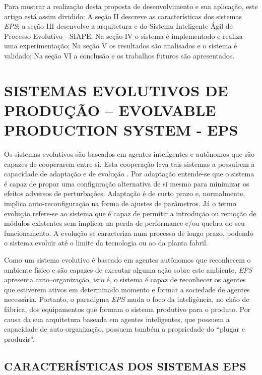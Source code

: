 \documentclass[10pt,letterpaper,twocolumn]{IEEEtran}
\begin{document}
 Para mostrar a realização desta proposta de desenvolvimento e sua aplicação, este artigo está assim dividido: A seção II descreve as características dos sistemas \textit{EPS}; a seção III desenvolve a arquitetura e do Sistema Inteligente Ágil de Processo Evolutivo - SIAPE; Na seção IV o sistema é implementado e realiza uma experimentação; Na seção V os resultados são analisados e o sistema é validado; Na seção VI a conclusão e os trabalhos futuros são apresentados.
 
\section{SISTEMAS EVOLUTIVOS DE PRODUÇÃO -- EVOLVABLE PRODUCTION SYSTEM - EPS}



Os sistemas evolutivos são baseados em agentes inteligentes e autônomos que são capazes de cooperarem entre si. Esta
cooperação leva tais sistemas a possuírem a capacidade de adaptação e de evolução \cite{ROSA2013c}.
Por adaptação entende-se que o sistema é capaz de propor uma configuração alternativa de si mesmo para minimizar os
efeitos adversos de perturbações. Adaptação é de curto prazo e, normalmente, implica auto-reconfiguração na forma de ajustes
de parâmetros. Já o termo evolução refere-se ao sistema que é capaz de permitir a introdução ou remoção de módulos
existentes sem implicar na perda de performance e/ou quebra do seu funcionamento. A evolução se caracteriza num processo
de longo prazo, podendo o sistema evoluir até o limite da tecnologia ou ao da planta fabril. \par

Como um sistema evolutivo é baseado em agentes autônomos que reconhecem o ambiente físico e são capazes de
executar alguma ação sobre este ambiente, \textit{EPS} apresenta auto--organização, isto é, o sistema é capaz de reconhecer os agentes
que estiverem ativos em determinado momento e formar a sociedade de agentes necessária. Portanto, o paradigma \textit{EPS}
muda o foco da inteligência, no chão de fábrica, dos equipamentos que formam o sistema produtivo para o produto. Por
causa da sua arquitetura baseada em agentes inteligentes, que possuem a capacidade de auto-organização, possuem também
a propriedade do “plugar e produzir”.


 \subsection{CARACTERÍSTICAS DOS SISTEMAS EPS}
\end{document}
